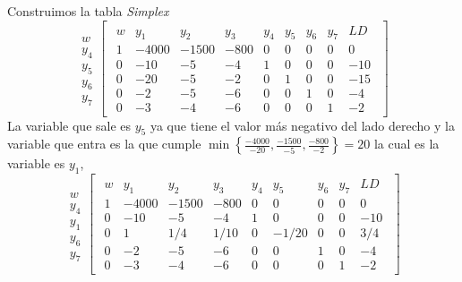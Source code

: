 \documentclass[11pt,letterpaper]{article}
\begin{document}
\begin{enumerate}
Construimos la tabla \textit{Simplex}
\begin{equation}
\begin{array}{c}
\\
w \\
y_4\\
y_5 \\
y_6 \\
y_7 
\end{array}
\begin{bmatrix}
\begin{array}{c||cccccccc}
  w & y_1 & y_2 & y_3 & y_4 & y_5 & y_6 & y_7 & LD \\ \hline \hline
  1 &-4000 &-1500 &-800& 0 & 0 & 0 & 0 & 0\\ 
  0 & -10 & -5 & -4 & 1 & 0 & 0 & 0 & -10  \\
  0 & -20 & -5 & -2 & 0 & 1 & 0 & 0 & -15 \\
  0 &  -2 & -5 & -6 & 0 & 0 & 1 & 0 &  -4 \\
  0 &  -3 & -4 & -6 & 0 & 0 & 0 & 1 &  -2
\end{array}
\end{bmatrix}
\end{equation}
La variable que sale es $y_5$ ya que tiene el valor más negativo del lado derecho y la variable que entra es la que cumple $\min \left\{\frac{-4000}{-20}, \frac{-1500}{-5}, \frac{-800}{-2}\right\}=20$ la cual es la variable es $y_1$,
\begin{equation}
\begin{array}{c}
\\
w \\
y_4\\
y_1 \\
y_6 \\
y_7 
\end{array}
\begin{bmatrix}
\begin{array}{c||cccccccc}
  w & y_1 & y_2 & y_3 & y_4 & y_5 & y_6 & y_7 & LD \\ \hline \hline
  1 &-4000 &-1500 &-800& 0 & 0 & 0 & 0 & 0\\ 
  0 & -10 & -5 &-4 & 1 & 0 & 0 & 0 & -10  \\
  0 &   1 & 1/4&1/10 & 0 &-1/20 & 0 & 0 & 3/4 \\
  0 &  -2 & -5 & -6 & 0 & 0 & 1 & 0 &  -4 \\
  0 &  -3 & -4 & -6 & 0 & 0 & 0 & 1 &  -2
\end{array}
\end{bmatrix}
\end{equation}

\end{enumerate}
\end{document}
